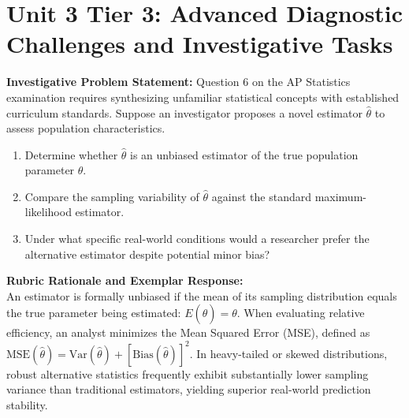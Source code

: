 \section{Unit 3 Tier 3: Advanced Diagnostic Challenges and Investigative Tasks}
\begin{frqrubricbox}
\textbf{Investigative Problem Statement:} Question 6 on the AP Statistics examination requires synthesizing unfamiliar statistical concepts with established curriculum standards. Suppose an investigator proposes a novel estimator $\hat{\theta}$ to assess population characteristics.
\begin{enumerate}[label=(\alph*)]
  \item Determine whether $\hat{\theta}$ is an unbiased estimator of the true population parameter $\theta$.
  \item Compare the sampling variability of $\hat{\theta}$ against the standard maximum-likelihood estimator.
  \item Under what specific real-world conditions would a researcher prefer the alternative estimator despite potential minor bias?
\end{enumerate}
\textbf{Rubric Rationale and Exemplar Response:}\\
An estimator is formally unbiased if the mean of its sampling distribution equals the true parameter being estimated: $E(\hat{\theta}) = \theta$. When evaluating relative efficiency, an analyst minimizes the Mean Squared Error (MSE), defined as $\text{MSE}(\hat{\theta}) = \text{Var}(\hat{\theta}) + [\text{Bias}(\hat{\theta})]^2$. In heavy-tailed or skewed distributions, robust alternative statistics frequently exhibit substantially lower sampling variance than traditional estimators, yielding superior real-world prediction stability.
\end{frqrubricbox}\vspace{6pt}
